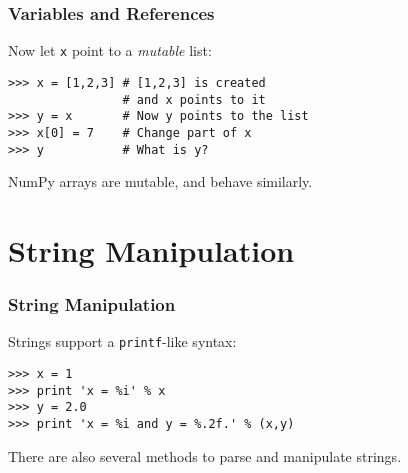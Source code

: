 \documentclass[red]{beamer}
\begin{document}
\begin{frame}[fragile]
    \frametitle{Variables and References}

    Now let \lstinline|x| point to a \textit{mutable} list:
    \begin{lstlisting}
>>> x = [1,2,3] # [1,2,3] is created
                # and x points to it
>>> y = x       # Now y points to the list
>>> x[0] = 7    # Change part of x
>>> y           # What is y?
    \end{lstlisting}
    
    NumPy arrays are mutable, and behave similarly.
\end{frame}
\section[Strings]{String Manipulation}
\begin{frame}[fragile]
    \frametitle{String Manipulation}

    Strings support a \lstinline|printf|-like syntax:
    \begin{lstlisting}
>>> x = 1
>>> print 'x = %i' % x
>>> y = 2.0
>>> print 'x = %i and y = %.2f.' % (x,y)
    \end{lstlisting}

    There are also several methods to parse and manipulate strings.
\end{frame}
\end{document}
